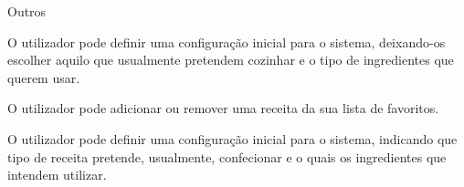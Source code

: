 \begin{requisitos}{Outros}
\begin{requsr}{}{O utilizador pode definir uma configuração inicial para o sistema, deixando-os escolher aquilo que usualmente pretendem cozinhar e o tipo de ingredientes que querem usar.}
    
    
  \end{requsr}

  \begin{requsr}{}{O utilizador pode adicionar ou remover uma receita da sua lista de favoritos.}
  
    
    
  \end{requsr}
  
  \begin{requsr}{}{O utilizador pode definir uma configuração inicial para o sistema, indicando que tipo de receita pretende, usualmente, confecionar e o quais os ingredientes que intendem utilizar.}
  \end{requsr}
  
\end{requisitos}

